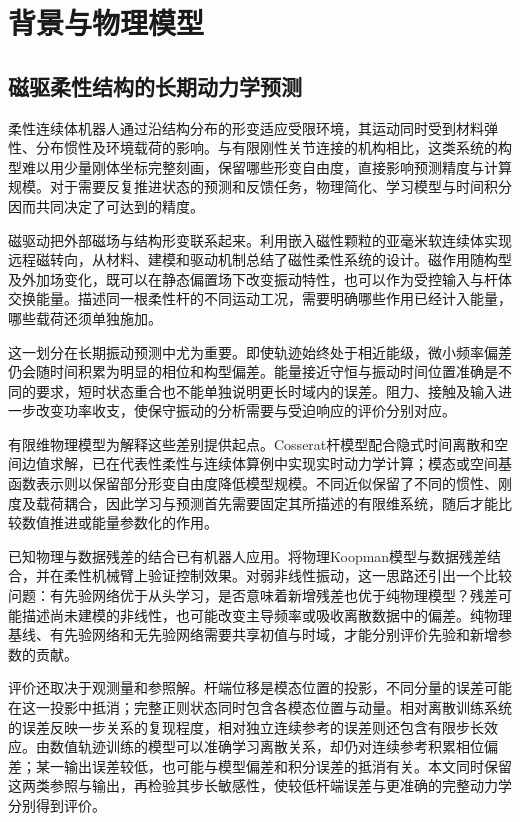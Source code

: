 \section{背景与物理模型}
\label{sec:background}

\subsection{磁驱柔性结构的长期动力学预测}

柔性连续体机器人通过沿结构分布的形变适应受限环境，其运动同时受到材料弹性、分布惯性及环境载荷的影响。与有限刚性关节连接的机构相比，这类系统的构型难以用少量刚体坐标完整刻画，保留哪些形变自由度，直接影响预测精度与计算规模\citep{RusTolley2015,DellaSantina2023}。对于需要反复推进状态的预测和反馈任务，物理简化、学习模型与时间积分因而共同决定了可达到的精度。

磁驱动把外部磁场与结构形变联系起来。\citet{Kim2019}利用嵌入磁性颗粒的亚毫米软连续体实现远程磁转向，\citet{KimZhao2022}从材料、建模和驱动机制总结了磁性柔性系统的设计。磁作用随构型及外加场变化，既可以在静态偏置场下改变振动特性，也可以作为受控输入与杆体交换能量。描述同一根柔性杆的不同运动工况，需要明确哪些作用已经计入能量，哪些载荷还须单独施加。

这一划分在长期振动预测中尤为重要。即使轨迹始终处于相近能级，微小频率偏差仍会随时间积累为明显的相位和构型偏差。能量接近守恒与振动时间位置准确是不同的要求，短时状态重合也不能单独说明更长时域内的误差。阻力、接触及输入进一步改变功率收支，使保守振动的分析需要与受迫响应的评价分别对应。

有限维物理模型为解释这些差别提供起点。Cosserat杆模型配合隐式时间离散和空间边值求解，已在代表性柔性与连续体算例中实现实时动力学计算\citep{Till2019}；模态或空间基函数表示则以保留部分形变自由度降低模型规模\citep{DellaSantina2023}。不同近似保留了不同的惯性、刚度及载荷耦合，因此学习与预测首先需要固定其所描述的有限维系统，随后才能比较数值推进或能量参数化的作用。

已知物理与数据残差的结合已有机器人应用。\citet{Bruder2025}将物理Koopman模型与数据残差结合，并在柔性机械臂上验证控制效果。对弱非线性振动，这一思路还引出一个比较问题：有先验网络优于从头学习，是否意味着新增残差也优于纯物理模型？残差可能描述尚未建模的非线性，也可能改变主导频率或吸收离散数据中的偏差。纯物理基线、有先验网络和无先验网络需要共享初值与时域，才能分别评价先验和新增参数的贡献。

评价还取决于观测量和参照解。杆端位移是模态位置的投影，不同分量的误差可能在这一投影中抵消；完整正则状态同时包含各模态位置与动量。相对离散训练系统的误差反映一步关系的复现程度，相对独立连续参考的误差则还包含有限步长效应。由数值轨迹训练的模型可以准确学习离散关系，却仍对连续参考积累相位偏差；某一输出误差较低，也可能与模型偏差和积分误差的抵消有关。本文同时保留这两类参照与输出，再检验其步长敏感性，使较低杆端误差与更准确的完整动力学分别得到评价。

